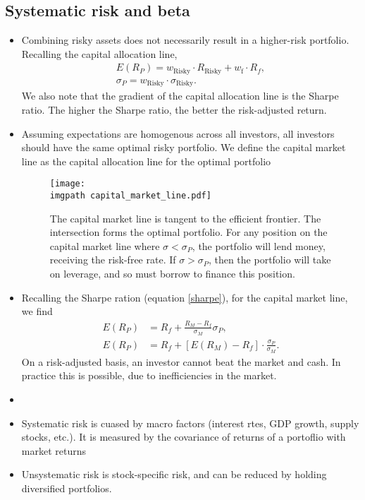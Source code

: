 \documentclass[../notes_compiled.tex]{subfiles}
\begin{document}
\subsection{Systematic risk and beta}
\begin{itemize}
\item Combining risky assets does not necessarily result in a higher-risk portfolio. Recalling the capital allocation line,
\begin{gather}
E(R_{P}) = w_{\text{Risky}}\cdot R_{\text{Risky}} + w_{\text{f}}\cdot R_{f}, \\
\sigma_{P} = w_{\text{Risky}}\cdot\sigma_{\text{Risky}}.
\end{gather}
We also note that the gradient of the capital allocation line is the Sharpe ratio. The higher the Sharpe ratio, the better the risk-adjusted return.
\item Assuming expectations are homogenous across all investors, all investors should have the same optimal risky portfolio. We define the capital market line as the capital allocation line for the optimal portfolio
\begin{figure}[h]
  \centering
  \texttt{[image: \\imgpath capital\_market\_line.pdf]}
  \caption{The capital market line is tangent to the efficient frontier. The intersection forms the optimal portfolio. For any position on the capital market line where $\sigma<\sigma_{P}$, the portfolio will lend money, receiving the risk-free rate. If $\sigma>\sigma_{P}$, then the portfolio will take on leverage, and so must borrow to finance this position.}
\end{figure}
\item Recalling the Sharpe ration (equation \ref{sharpe}), for the capital market line, we find
\begin{align}
E(R_{P}) &= R_{f} + \frac{R_{M} - R_{f}}{\sigma_{M}}\sigma_{P}, \\
E(R_{P}) &= R_{f} + \left[E(R_{M}) - R_{f}\right]\cdot\frac{\sigma_{P}}{\sigma_{M}}.
\end{align}
On a risk-adjusted basis, an investor cannot beat the market and cash. In practice this is possible, due to inefficiencies in the market.
\item[]
\item Systematic risk is cuased by macro factors (interest rtes, GDP growth, supply stocks, etc.). It is measured by the covariance of returns of a portoflio with market returns
\item Unsystematic risk is stock-specific risk, and can be reduced by holding diversified portfolios.

\end{itemize}
\end{document}
